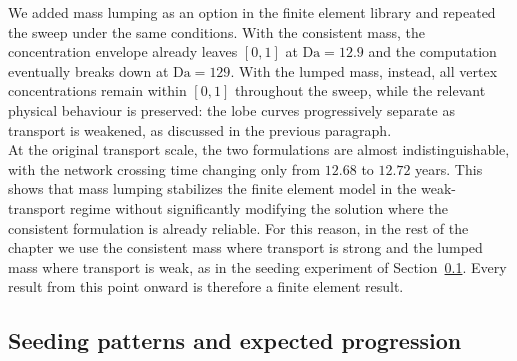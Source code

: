 We added mass lumping as an option in the finite element library and repeated the sweep under the same conditions. With the consistent mass, the concentration envelope already leaves $[0,1]$ at $\mathrm{Da}=12.9$ and the computation eventually breaks down at $\mathrm{Da}=129$. With the lumped mass, instead, all vertex concentrations remain within $[0,1]$ throughout the sweep, while the relevant physical behaviour is preserved: the lobe curves progressively separate as transport is weakened, as discussed in the previous paragraph.\\
At the original transport scale, the two formulations are almost indistinguishable, with the network crossing time changing only from $12.68$ to $12.72$ years. This shows that mass lumping stabilizes the finite element model in the weak-transport regime without significantly modifying the solution where the consistent formulation is already reliable. For this reason, in the rest of the chapter we use the consistent mass where transport is strong and the lumped mass where transport is weak, as in the seeding experiment of Section~\ref{sec:staging}. Every result from this point onward is therefore a finite element result.



\subsection{Seeding patterns and expected progression}
\label{sec:staging}

